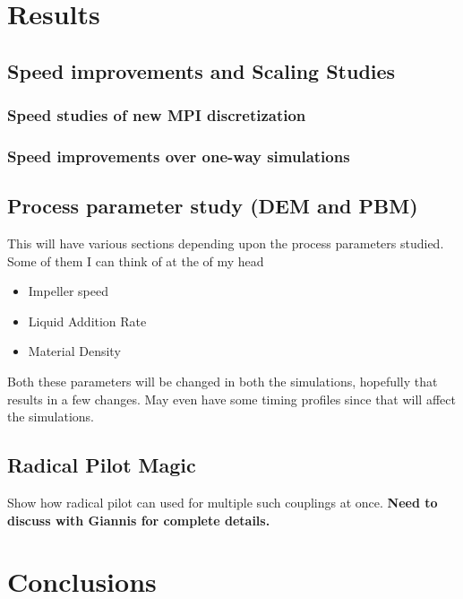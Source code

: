\documentclass[preprint,11pt,authoryear]{elsarticle}
\begin{document}
\section{Results}

\subsection{Speed improvements and Scaling Studies}

\subsubsection{Speed studies of new MPI discretization}

\subsubsection{Speed improvements over one-way simulations}

\subsection{Process parameter study (DEM and PBM)}
\par This will have various sections depending upon the process parameters studied.
Some of them I can think of at the of my head
\begin{itemize}
\item{Impeller speed}
\item{Liquid Addition Rate}
\item{Material Density}
\end{itemize} 
\par Both these parameters will be changed in both the simulations, hopefully that results in a few changes.
May even have some timing profiles since that will affect the simulations.

\subsection{Radical Pilot Magic}
\par Show how radical pilot can used for multiple such couplings at once.
\textbf{Need to discuss with Giannis for complete details.}

\section{Conclusions}



%
%
\end{document}
